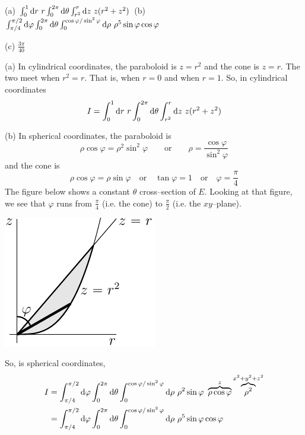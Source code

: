%

\begin{answer}
(a) $\int_0^1 \mathrm{d}r\ r \int_0^{2\pi}\mathrm{d}\theta \int_{r^2}^r\mathrm{d}z\
           z(r^2+z^2)$\qquad
(b) $\int_{\pi/4}^{\pi/2} \dee{\varphi} \int_0^{2\pi}\dee{\theta}
         \int_0^{\cos\varphi/\sin^2\varphi} \dee{\rho}\ \rho^5\sin\varphi 
             \cos\varphi$

(c) $\frac{3\pi}{40}$
\end{answer}

\begin{solution}
(a)
In cylindrical coordinates, the paraboloid is $z=r^2$ and
the cone is $z=r$. The two meet when $r^2=r$. That is, when $r=0$
and when $r=1$. So, in cylindrical coordinates
\begin{align*}
I = \int_0^1 \mathrm{d}r\ r \int_0^{2\pi}\mathrm{d}\theta \int_{r^2}^r\mathrm{d}z\
           z(r^2+z^2)
\end{align*}

(b) In spherical coordinates, the paraboloid is 
\begin{equation*}
\rho\cos\varphi=\rho^2\sin^2\varphi\qquad\text{or}\qquad
     \rho=\frac{\cos\varphi}{\sin^2\varphi}
\end{equation*}
and the cone is 
\begin{equation*}
\rho\cos\varphi=\rho\sin\varphi\quad\text{or}\quad
\tan\varphi=1\quad\text{or}\quad
\varphi=\frac{\pi}{4}
\end{equation*} 
The figure below shows  a constant $\theta$ cross--section of
$E$. Looking at that figure, we see that $\varphi$ runs from
$\frac{\pi}{4}$ (i.e. the cone) to $\frac{\pi}{2}$
(i.e. the $xy$--plane).

\begin{center}
\includegraphics{fig/OE15D_8.pdf}
\end{center}

So, is spherical coordinates,
\begin{align*}
I &= \int_{\pi/4}^{\pi/2} \dee{\varphi} \int_0^{2\pi}\dee{\theta}
         \int_0^{\cos\varphi/\sin^2\varphi} \dee{\rho}\ \rho^2\sin\varphi \ 
             \overbrace{\rho\cos\varphi}^{z}
             \overbrace{\rho^2}^{x^2+y^2+z^2} \\
&= \int_{\pi/4}^{\pi/2} \dee{\varphi} \int_0^{2\pi}\dee{\theta}
         \int_0^{\cos\varphi/\sin^2\varphi} \dee{\rho}\ \rho^5\sin\varphi 
             \cos\varphi
\end{align*}


\end{solution}
